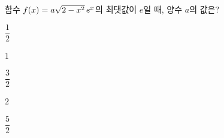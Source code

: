 함수 $f(x)=a\sqrt{2-x^2}\mkern3mu e^x$의 최댓값이 $e$일 때, 양수 $a$의 값은?
\begin{choices32}{\rule[-3ex]{0pt}{8ex}$\dfrac{1}{2}$}{\rule[-3ex]{0pt}{8ex}$1$}{\rule[-3ex]{0pt}{8ex}$\dfrac{3}{2}$}{\rule[-3ex]{0pt}{8ex}$2$}{\rule[-3ex]{0pt}{8ex}$\dfrac{5}{2}$}\end{choices32}
